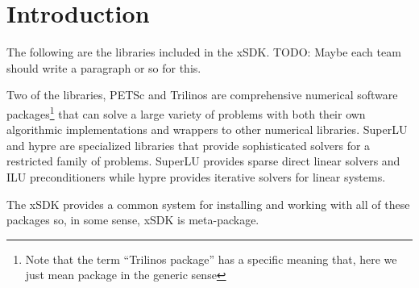 \chapter*{Introduction}
The following are the libraries included in the xSDK.
{\color{red}TODO: Maybe each team should write a paragraph or so for this.}

Two of the libraries, PETSc and Trilinos are comprehensive numerical
software packages\footnote{Note that the term ``Trilinos package'' has
  a specific meaning that, here we just mean package in the generic
  sense} that can solve a large variety of problems with both their
own algorithmic implementations and wrappers to other numerical
libraries. SuperLU and hypre are specialized libraries that provide
sophisticated solvers for a restricted family of problems. SuperLU
provides sparse direct linear solvers and ILU preconditioners while
hypre provides iterative solvers for linear systems.

The xSDK provides a common system for installing and working with all of these packages so, in some sense, xSDK is meta-package.








